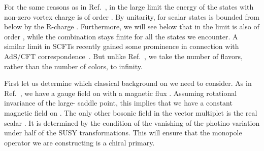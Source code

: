 \documentclass[a4paper,12pt, amsfonts, amssymb]{article}
\providecommand{\RR}{{\mathbb R}}
\renewcommand{\SS}{{\mathbb S}}
\providecommand{\ra}{\rightarrow}
\begin{document}
For the same reasons as in Ref.~\cite{BKWone},
in the large \coordHE{} limit the energy \coordHE{} of the states with non-zero 
vortex charge is of order \coordHE{}. By unitarity, for scalar states
\coordHE{} is bounded from below by the R-charge \coordHE{}.
Furthermore, we will see below that in the limit \myHighlight{$N_f\ra\infty$}\coordHE{}  \coordHE{}
is also of order \coordHE{}, while the combination \coordHE{} stays finite for 
all the states we encounter. A similar limit in \coordHE{} SCFTs recently gained
some prominence in connection with AdS/CFT correspondence~\cite{BMN}. But
unlike Ref.~\cite{BMN}, we take the number of flavors, rather than the 
number of colors, to infinity.

First let us determine which classical background on \myHighlight{$\SS^2\times\RR$}\coordHE{} we need
to consider. As in Ref.~\cite{BKWone}, we have a gauge field on 
\myHighlight{$\SS^2\times\RR$}\coordHE{}
with a magnetic flux \coordHE{}. Assuming rotational invariance of the 
large-\coordHE{} saddle point, this implies that we have a constant magnetic 
field on \myHighlight{$\SS^2$}\coordHE{}. The only other bosonic field in the \coordHE{} vector multiplet 
is the real scalar \myHighlight{$\chi$}\coordHE{}. It is determined by the condition of the vanishing of the photino variation under half of the SUSY transformations. This will
ensure that the monopole operator we are constructing is a chiral primary.
\end{document}
